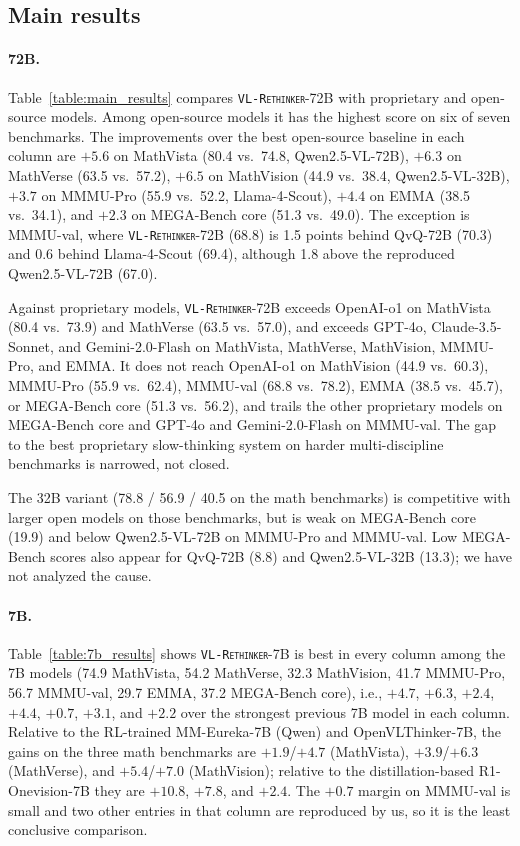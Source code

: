 \documentclass{article}
\newcommand{\model}{\texttt{\textsc{VL-Rethinker}}\xspace}
\begin{document}
\subsection{Main results}

\paragraph{72B.} Table~\ref{table:main_results} compares \model-72B with proprietary and open-source models. Among open-source models it has the highest score on six of seven benchmarks. The improvements over the best open-source baseline in each column are $+5.6$ on MathVista (80.4 vs.\ 74.8, Qwen2.5-VL-72B), $+6.3$ on MathVerse (63.5 vs.\ 57.2), $+6.5$ on MathVision (44.9 vs.\ 38.4, Qwen2.5-VL-32B), $+3.7$ on MMMU-Pro (55.9 vs.\ 52.2, Llama-4-Scout), $+4.4$ on EMMA (38.5 vs.\ 34.1), and $+2.3$ on MEGA-Bench core (51.3 vs.\ 49.0). The exception is MMMU-val, where \model-72B (68.8) is 1.5 points behind QvQ-72B (70.3) and 0.6 behind Llama-4-Scout (69.4), although 1.8 above the reproduced Qwen2.5-VL-72B (67.0).

Against proprietary models, \model-72B exceeds OpenAI-o1 on MathVista (80.4 vs.\ 73.9) and MathVerse (63.5 vs.\ 57.0), and exceeds GPT-4o, Claude-3.5-Sonnet, and Gemini-2.0-Flash on MathVista, MathVerse, MathVision, MMMU-Pro, and EMMA. It does not reach OpenAI-o1 on MathVision (44.9 vs.\ 60.3), MMMU-Pro (55.9 vs.\ 62.4), MMMU-val (68.8 vs.\ 78.2), EMMA (38.5 vs.\ 45.7), or MEGA-Bench core (51.3 vs.\ 56.2), and trails the other proprietary models on MEGA-Bench core and GPT-4o and Gemini-2.0-Flash on MMMU-val. The gap to the best proprietary slow-thinking system on harder multi-discipline benchmarks is narrowed, not closed.

The 32B variant (78.8 / 56.9 / 40.5 on the math benchmarks) is competitive with larger open models on those benchmarks, but is weak on MEGA-Bench core (19.9) and below Qwen2.5-VL-72B on MMMU-Pro and MMMU-val. Low MEGA-Bench scores also appear for QvQ-72B (8.8) and Qwen2.5-VL-32B (13.3); we have not analyzed the cause.



\paragraph{7B.} Table~\ref{table:7b_results} shows \model-7B is best in every column among the 7B models (74.9 MathVista, 54.2 MathVerse, 32.3 MathVision, 41.7 MMMU-Pro, 56.7 MMMU-val, 29.7 EMMA, 37.2 MEGA-Bench core), i.e., $+4.7$, $+6.3$, $+2.4$, $+4.4$, $+0.7$, $+3.1$, and $+2.2$ over the strongest previous 7B model in each column. Relative to the RL-trained MM-Eureka-7B (Qwen) and OpenVLThinker-7B, the gains on the three math benchmarks are $+1.9$/$+4.7$ (MathVista), $+3.9$/$+6.3$ (MathVerse), and $+5.4$/$+7.0$ (MathVision); relative to the distillation-based R1-Onevision-7B they are $+10.8$, $+7.8$, and $+2.4$. The $+0.7$ margin on MMMU-val is small and two other entries in that column are reproduced by us, so it is the least conclusive comparison.
\end{document}
